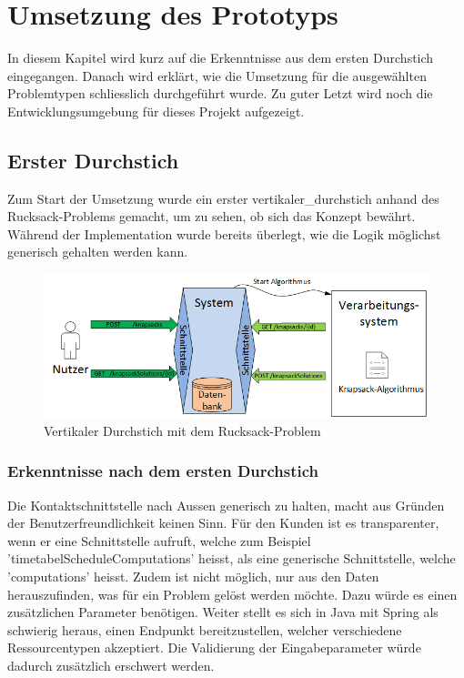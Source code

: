 %
%

\chapter{Umsetzung des Prototyps \resultAssignment{[R5]}}\label{chap.umsetzung}
In diesem Kapitel wird kurz auf die Erkenntnisse aus dem ersten Durchstich eingegangen. Danach wird erklärt, wie die Umsetzung für die ausgewählten Problemtypen schliesslich 
durchgeführt wurde. Zu guter Letzt wird noch die Entwicklungsumgebung für dieses Projekt aufgezeigt.

\section{Erster Durchstich}\label{entwicklungsumgebung}
Zum Start der Umsetzung wurde ein erster \gls{vertikaler_durchstich} anhand des Rucksack-Problems gemacht, um zu sehen, ob sich das Konzept bewährt. Während der 
Implementation wurde bereits überlegt, wie die Logik möglichst generisch gehalten werden kann.

\begin{figure}[h]
\centering
\includegraphics[scale=0.74]{images/visio/prototype_knapsack.png}
\caption[\Gls{vertikaler_durchstich} mit dem Rucksack-Problem]{Vertikaler Durchstich mit dem Rucksack-Problem \selfmade{}}
\label{fig:prototyp_knapsack}
\end{figure}

\subsection{Erkenntnisse nach dem ersten Durchstich}\label{learning_prototyp}
Die Kontaktschnittstelle nach Aussen generisch zu halten, macht aus Gründen der Benutzerfreundlichkeit keinen Sinn. Für den Kunden ist es transparenter, wenn er eine Schnittstelle aufruft, 
welche zum Beispiel 'timetabelScheduleComputations' heisst, als eine generische Schnittstelle, welche 'computations' heisst. Zudem ist nicht möglich, nur aus den Daten herauszufinden, was für 
ein Problem gelöst werden möchte. Dazu würde es einen zusätzlichen Parameter benötigen. Weiter stellt es sich in Java mit Spring als schwierig heraus, einen Endpunkt bereitzustellen, welcher 
verschiedene Ressourcentypen akzeptiert. Die Validierung der Eingabeparameter würde dadurch zusätzlich erschwert werden.

